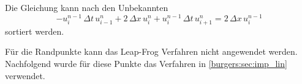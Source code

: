 	Die Gleichung kann nach den Unbekannten
	\begin{equation}
	   -u_{i}^{n-1} \, \Delta t \, u_{i-1}^{n} +  2 \, \Delta x \,  u_{i}^{n} + u_{i}^{n-1} \, \Delta t \, u_{i+1}^{n} =  2 \, \Delta x \, u_{i}^{n-1}
	\end{equation}
	sortiert werden.


	F\"ur die Randpunkte kann das Leap-Frog Verfahren nicht angewendet werden.
	Nachfolgend wurde f\"ur diese Punkte das Verfahren in \autoref{burgers:sec:imp_lin} verwendet.

